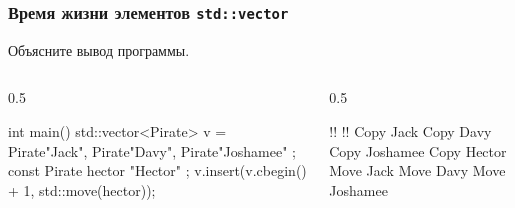 \documentclass[compress, 8pt]{beamer}
\begin{document}
  \begin{frame}[fragile]

    \frametitle{Время жизни элементов \texttt{std::vector}}

    \begin{task}
      Объясните вывод программы.
    \end{task}

    \begin{columns}[T]

      \begin{column}{0.5\textwidth}

        \begin{mycppinplacelisting}
int main() {
    std::vector<Pirate> v = {
        Pirate{"Jack"},
        Pirate{"Davy"},
        Pirate{"Joshamee"}
    };
    const Pirate hector
        { "Hector" };
    v.insert(v.cbegin() + 1,
         std::move(hector));
}
        \end{mycppinplacelisting}

      \end{column}

      \begin{column}{0.5\textwidth}

        \begin{terminalwindow}
!!
!!
Copy Jack
Copy Davy
Copy Joshamee
Copy Hector
Move Jack
Move Davy
Move Joshamee
        \end{terminalwindow}

      \end{column}

    \end{columns}

  \end{frame}
\end{document}

